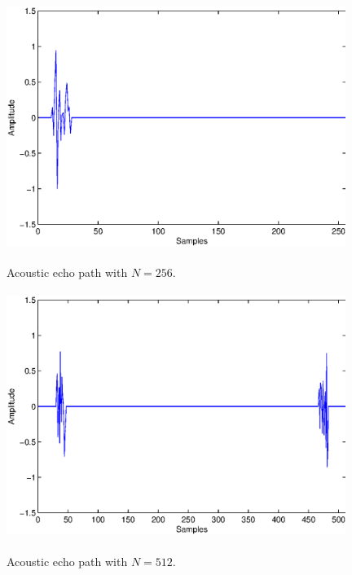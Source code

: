 \begin{figure}[!htb]
\begin{center}
\vspace{1cm}
\includegraphics[width=11cm, height=8cm]{Figures/Chapter5/fig1a.eps}\\
\end{center}
\vspace{-1cm}
\caption{Acoustic echo path with $N=256$.}
\label{fig1}
\vspace{1.5cm}
\end{figure}
\begin{figure}[!htb]
\begin{center}
\vspace{1cm}
\includegraphics[width=11cm, height=8cm]{Figures/Chapter5/fig2b.eps}\\
\end{center}
\vspace{-1cm}
\caption{Acoustic echo path with $N=512$.}
\label{fig2}
\vspace{1.5cm}
\end{figure}

